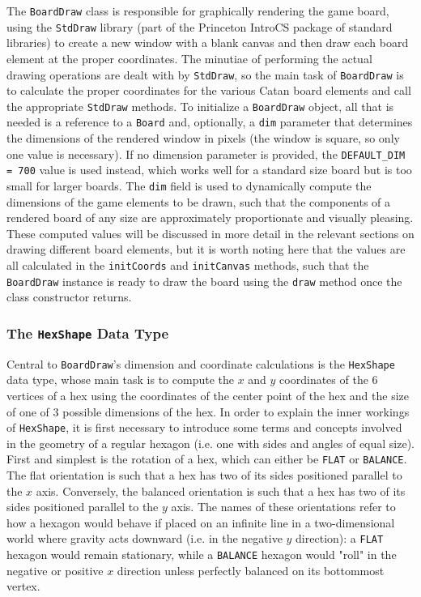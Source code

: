 \documentclass[pageno]{jpaper}
\begin{document}
\begin{doublespacing}
The \lstinline$BoardDraw$ class is responsible for graphically rendering the game board, using the \lstinline$StdDraw$ library (part of the Princeton IntroCS package of standard libraries) to create a new window with a blank canvas and then draw each board element at the proper coordinates. The minutiae of performing the actual drawing operations are dealt with by \lstinline$StdDraw$, so the main task of \lstinline$BoardDraw$ is to calculate the proper coordinates for the various Catan board elements and call the appropriate \lstinline$StdDraw$ methods. To initialize a \lstinline$BoardDraw$ object, all that is needed is a reference to a \lstinline$Board$ and, optionally, a \lstinline$dim$ parameter that determines the dimensions of the rendered window in pixels (the window is square, so only one value is necessary). If no dimension parameter is provided, the \lstinline$DEFAULT_DIM = 700$ value is used instead, which works well for a standard size board but is too small for larger boards. The \lstinline$dim$ field is used to dynamically compute the dimensions of the game elements to be drawn, such that the components of a rendered board of any size are approximately proportionate and visually pleasing. These computed values will be discussed in more detail in the relevant sections on drawing different board elements, but it is worth noting here that the values are all calculated in the \lstinline$initCoords$ and \lstinline$initCanvas$ methods, such that the \lstinline$BoardDraw$ instance is ready to draw the board using the \lstinline$draw$ method once the class constructor returns.

\hypertarget{sec:the_hexshape_data_type}{}
\subsubsection{The \lstinline$HexShape$ Data Type}

Central to \lstinline$BoardDraw$'s dimension and coordinate calculations is the \lstinline$HexShape$ data type, whose main task is to compute the $x$ and $y$ coordinates of the 6 vertices of a hex using the coordinates of the center point of the hex and the size of one of 3 possible dimensions of the hex. In order to explain the inner workings of \lstinline$HexShape$, it is first necessary to introduce some terms and concepts involved in the geometry of a regular hexagon (i.e. one with sides and angles of equal size). First and simplest is the rotation of a hex, which can either be \lstinline$FLAT$ or \lstinline$BALANCE$. The flat orientation is such that a hex has two of its sides positioned parallel to the $x$ axis. Conversely, the balanced orientation is such that a hex has two of its sides positioned parallel to the $y$ axis. The names of these orientations refer to how a hexagon would behave if placed on an infinite line in a two-dimensional world where gravity acts downward (i.e. in the negative $y$ direction): a \lstinline$FLAT$ hexagon would remain stationary, while a \lstinline$BALANCE$ hexagon would "roll" in the negative or positive $x$ direction unless perfectly balanced on its bottommost vertex.


\end{doublespacing}
\end{document}
